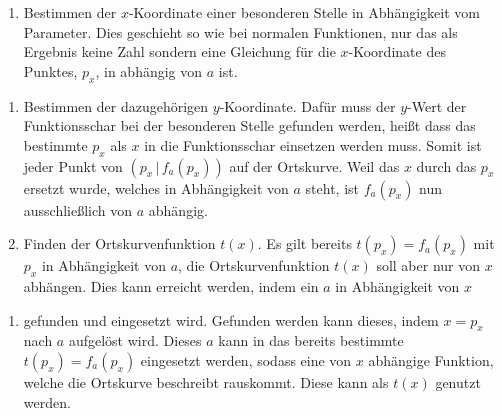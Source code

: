 \documentclass{article}
\begin{document}
\begin{enumerate}
 \item Bestimmen der $x$-Koordinate einer besonderen Stelle in Abhängigkeit vom Parameter. Dies geschieht so wie bei normalen Funktionen, nur das als Ergebnis keine Zahl sondern eine Gleichung für die $x$-Koordinate des Punktes, $p_x$, in abhängig von $a$ ist.
\end{enumerate}   
\begin{minipage}[t]{\dimexpr\textwidth-5cm}
 \begin{enumerate} 
 \item[2.] Bestimmen der dazugehörigen $y$-Koordinate. Dafür muss der $y$-Wert der Funktionsschar bei der besonderen Stelle gefunden werden, heißt dass das bestimmte $p_x$ als $x$ in die Funktionsschar einsetzen werden muss. Somit ist jeder Punkt von $(p_x \,|\, f_a(p_x))$ auf der Ortskurve. Weil das $x$ durch das $p_x$ ersetzt wurde, welches in Abhängigkeit von $a$ steht, ist $f_a(p_x)$ nun ausschließlich von $a$ abhängig.
 \item[3.] Finden der Ortskurvenfunktion $t(x)$. Es gilt bereits $t(p_x) = f_a(p_x)$ mit $p_x$ in Abhängigkeit von $a$, die Ortskurvenfunktion $t(x)$ soll aber nur von $x$ abhängen. Dies kann erreicht werden, indem ein $a$ in Abhängigkeit von $x$
 \end{enumerate}
 \end{minipage}
\hfill
\begin{minipage}[t]{5cm}
  \centering
\end{minipage}
\begin{enumerate}
 \vspace{-0.7em} 
 \item[] gefunden und eingesetzt wird. Gefunden werden kann dieses, indem $x = p_x$ nach $a$ aufgelöst wird. Dieses $a$ kann in das bereits bestimmte $t(p_x) = f_a(p_x)$ eingesetzt werden, sodass eine von $x$ abhängige Funktion, welche die Ortskurve beschreibt rauskommt. Diese kann als $t(x)$ genutzt werden.
\end{enumerate}
 
\end{document}
